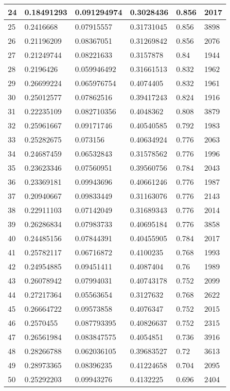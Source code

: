 \begin{longtable}{|l|l|l|l|l|l|}
24 & 0.18491293 & 0.091294974 & 0.3028436 & 0.856 & 2017 \\ \hline 
25 & 0.2416668 & 0.07915557 & 0.31731045 & 0.856 & 3898 \\ \hline 
26 & 0.21196209 & 0.08367051 & 0.31269842 & 0.856 & 2076 \\ \hline 
27 & 0.21249744 & 0.08221633 & 0.3157878 & 0.84 & 1944 \\ \hline 
28 & 0.2196426 & 0.059946492 & 0.31661513 & 0.832 & 1962 \\ \hline 
29 & 0.26699224 & 0.065976754 & 0.4074405 & 0.832 & 1961 \\ \hline 
30 & 0.25012577 & 0.07862516 & 0.39417243 & 0.824 & 1916 \\ \hline 
31 & 0.22235109 & 0.082710356 & 0.4048362 & 0.808 & 3879 \\ \hline 
32 & 0.25961667 & 0.09171746 & 0.40540585 & 0.792 & 1983 \\ \hline 
33 & 0.25282675 & 0.073156 & 0.40634924 & 0.776 & 2063 \\ \hline 
34 & 0.24687459 & 0.06532843 & 0.31578562 & 0.776 & 1996 \\ \hline 
35 & 0.23623346 & 0.07560951 & 0.39560756 & 0.784 & 2043 \\ \hline 
36 & 0.23369181 & 0.09943696 & 0.40661246 & 0.776 & 1987 \\ \hline 
37 & 0.20940667 & 0.09833449 & 0.31163076 & 0.776 & 2143 \\ \hline 
38 & 0.22911103 & 0.07142049 & 0.31689343 & 0.776 & 2014 \\ \hline 
39 & 0.26286834 & 0.07983733 & 0.40695184 & 0.776 & 3858 \\ \hline 
40 & 0.24485156 & 0.07844391 & 0.40455905 & 0.784 & 2017 \\ \hline 
41 & 0.25782117 & 0.06716872 & 0.4100235 & 0.768 & 1993 \\ \hline 
42 & 0.24954885 & 0.09451411 & 0.4087404 & 0.76 & 1989 \\ \hline 
43 & 0.26078942 & 0.07994031 & 0.40743178 & 0.752 & 2099 \\ \hline 
44 & 0.27217364 & 0.05563654 & 0.3127632 & 0.768 & 2622 \\ \hline 
45 & 0.26664722 & 0.09573858 & 0.4076347 & 0.752 & 2015 \\ \hline 
46 & 0.2570455 & 0.087793395 & 0.40826637 & 0.752 & 2315 \\ \hline 
47 & 0.26561984 & 0.083847575 & 0.4054851 & 0.736 & 3916 \\ \hline 
48 & 0.28266788 & 0.062036105 & 0.39683527 & 0.72 & 3613 \\ \hline 
49 & 0.28973365 & 0.08396235 & 0.41224658 & 0.704 & 2095 \\ \hline 
50 & 0.25292203 & 0.09943276 & 0.4132225 & 0.696 & 2404 \\ \hline 
\end{longtable}